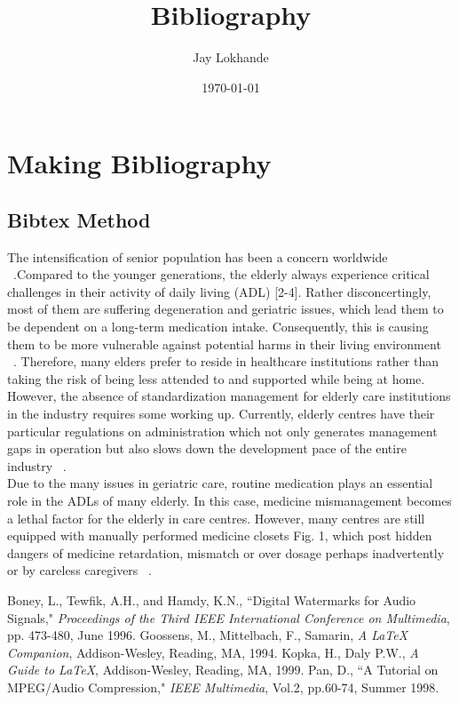 \documentclass[12pt]{article}
\author{\large Jay Lokhande}
\date{\today}
\begin{document}
\raggedright
\title{\huge \bf Bibliography}
\maketitle
{}
\newpage
{}

\newpage
\section{ Making Bibliography}

\subsection{Bibtex Method}

The intensification of senior population has been a concern worldwide ~\cite{Boney96}.Compared to the younger generations, the elderly always experience critical challenges in their activity of daily living (ADL) [2-4]. Rather disconcertingly, most of them are suffering degeneration and geriatric issues, which lead them to be dependent on a long-term medication intake. Consequently, this is causing them to be more vulnerable against potential harms in their living environment ~\cite{MG}.
Therefore, many elders prefer to reside in healthcare institutions rather than taking the risk of being less attended to and supported while being at home.\\ However, the absence of standardization management for elderly care institutions in the industry requires some working up. Currently, elderly centres have their particular regulations on administration which not only generates management gaps in operation but also slows down the development pace of the entire industry ~\cite{HK}.\\
Due to the many issues in geriatric care, routine medication plays an essential
role in the ADLs of many elderly. In this case, medicine mismanagement becomes
a lethal factor for the elderly in care centres. However, many centres are still
equipped with manually performed medicine closets Fig. 1, which post hidden
dangers of medicine retardation, mismatch or over dosage perhaps inadvertently or
by careless caregivers ~\cite{Pan}. 


\begin{thebibliography} {}

 Boney, L., Tewfik, A.H., and Hamdy, K.N., ``Digital
Watermarks for Audio Signals," \emph{Proceedings of the Third IEEE
International Conference on Multimedia}, pp. 473-480, June 1996.
 Goossens, M., Mittelbach, F., Samarin, \emph{A LaTeX
Companion}, Addison-Wesley, Reading, MA, 1994.
 Kopka, H., Daly P.W., \emph{A Guide to LaTeX},
Addison-Wesley, Reading, MA, 1999.
 Pan, D., ``A Tutorial on MPEG/Audio Compression," \emph{IEEE
Multimedia}, Vol.2, pp.60-74, Summer 1998.
\end{thebibliography}
\end{document}
